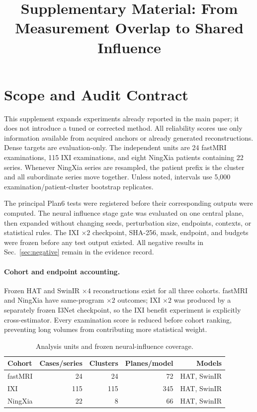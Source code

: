 \documentclass[10pt,twocolumn,letterpaper]{article}
\title{Supplementary Material: From Measurement Overlap to Shared Influence}
\begin{document}
\maketitle

\section{Scope and Audit Contract}
This supplement expands experiments already reported in the main paper; it does not introduce a tuned or corrected method. All reliability scores use only information available from acquired anchors or already generated reconstructions. Dense targets are evaluation-only. The independent units are 24 fastMRI examinations, 115 IXI examinations, and eight NingXia patients containing 22 series. Whenever NingXia series are resampled, the patient prefix is the cluster and all subordinate series move together. Unless noted, intervals use 5,000 examination/patient-cluster bootstrap replicates.

The principal Plan6 tests were registered before their corresponding outputs were computed. The neural influence stage gate was evaluated on one central plane, then expanded without changing seeds, perturbation size, endpoints, contexts, or statistical rules. The IXI $\times2$ checkpoint, SHA-256, mask, endpoint, and budgets were frozen before any test output existed. All negative results in Sec.~\ref{sec:negative} remain in the evidence record.

\paragraph{Cohort and endpoint accounting.}
Frozen HAT and SwinIR $\times4$ reconstructions exist for all three cohorts. fastMRI and NingXia have same-program $\times2$ outcomes; IXI $\times2$ was produced by a separately frozen I3Net checkpoint, so the IXI benefit experiment is explicitly cross-estimator. Every examination score is reduced before cohort ranking, preventing long volumes from contributing more statistical weight.

\begin{table}[t]
\centering
\caption{Analysis units and frozen neural-influence coverage.}
\label{tab:s_cohorts}
\setlength{\tabcolsep}{7pt}
\begin{tabular}{lrrrr}
\toprule
Cohort&Cases/series&Clusters&Planes/model&Models\\
\midrule
fastMRI&24&24&72&HAT, SwinIR\\
IXI&115&115&345&HAT, SwinIR\\
NingXia&22&8&66&HAT, SwinIR\\
\bottomrule
\end{tabular}
\end{table}
\end{document}
